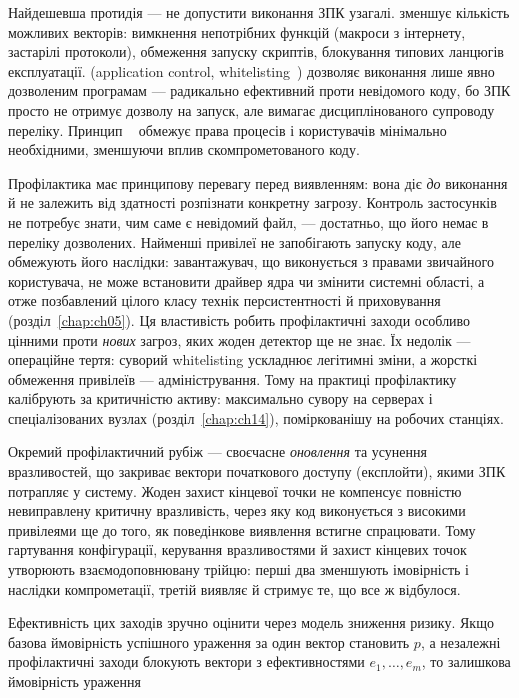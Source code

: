 Найдешевша протидія --- не допустити виконання ЗПК узагалі.  зменшує кількість можливих векторів: вимкнення непотрібних функцій (макроси з інтернету, застарілі протоколи), обмеження запуску скриптів, блокування типових ланцюгів експлуатації.  (application control, whitelisting~\cite{ch10:appcontrol}) дозволяє виконання лише явно дозволеним програмам --- радикально ефективний проти невідомого коду, бо ЗПК просто не отримує дозволу на запуск, але вимагає дисциплінованого супроводу переліку. Принцип ~\cite{ch10:least-priv} обмежує права процесів і користувачів мінімально необхідними, зменшуючи вплив скомпрометованого коду.

Профілактика має принципову перевагу перед виявленням: вона діє \emph{до} виконання й не залежить від здатності розпізнати конкретну загрозу. Контроль застосунків не потребує знати, чим саме є невідомий файл, --- достатньо, що його немає в переліку дозволених. Найменші привілеї не запобігають запуску коду, але обмежують його наслідки: завантажувач, що виконується з правами звичайного користувача, не може встановити драйвер ядра чи змінити системні області, а отже позбавлений цілого класу технік персистентності й приховування (розділ~\ref{chap:ch05}). Ця властивість робить профілактичні заходи особливо цінними проти \emph{нових} загроз, яких жоден детектор ще не знає. Їх недолік --- операційне тертя: суворий whitelisting ускладнює легітимні зміни, а жорсткі обмеження привілеїв --- адміністрування. Тому на практиці профілактику калібрують за критичністю активу: максимально сувору на серверах і спеціалізованих вузлах (розділ~\ref{chap:ch14}), поміркованішу на робочих станціях.

Окремий профілактичний рубіж --- своєчасне \emph{оновлення} та усунення вразливостей, що закриває вектори початкового доступу (експлойти), якими ЗПК потрапляє у систему. Жоден захист кінцевої точки не компенсує повністю невиправлену критичну вразливість, через яку код виконується з високими привілеями ще до того, як поведінкове виявлення встигне спрацювати. Тому гартування конфігурації, керування вразливостями й захист кінцевих точок утворюють взаємодоповнювану трійцю: перші два зменшують імовірність і наслідки компрометації, третій виявляє й стримує те, що все ж відбулося.

Ефективність цих заходів зручно оцінити через модель зниження ризику. Якщо базова ймовірність успішного ураження за один вектор становить $p$, а незалежні профілактичні заходи блокують вектори з ефективностями $e_1,\dots,e_m$, то залишкова ймовірність ураження

